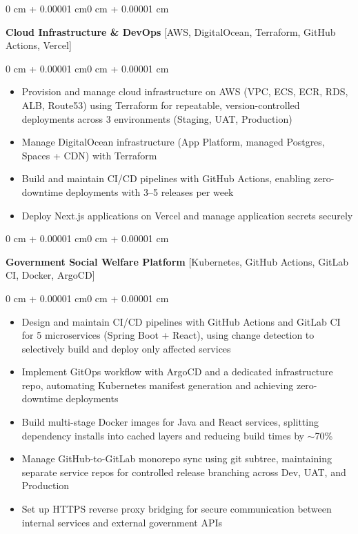 \documentclass[10pt, letterpaper]{article}
\newenvironment{highlights}{
    \begin{itemize}[
        topsep=0.06 cm,
        parsep=0.06 cm,
        partopsep=0pt,
        itemsep=0pt,
        leftmargin=0.4 cm + 10pt
    ]
}{
    \end{itemize}
}
\newenvironment{onecolentry}{
    \begin{adjustwidth}{0 cm + 0.00001 cm}{0 cm + 0.00001 cm}
}{
    \end{adjustwidth}
}
\begin{document}
        \vspace{0.22 cm}
        \begin{onecolentry}
            \textbf{Cloud Infrastructure \& DevOps} [AWS, DigitalOcean, Terraform, GitHub Actions, Vercel]
        \end{onecolentry}

        \vspace{0.10 cm}
        \begin{onecolentry}
            \begin{highlights}
                \item Provision and manage cloud infrastructure on AWS (VPC, ECS, ECR, RDS, ALB, Route53) using Terraform for repeatable, version-controlled deployments across 3 environments (Staging, UAT, Production)
                \item Manage DigitalOcean infrastructure (App Platform, managed Postgres, Spaces + CDN) with Terraform
                \item Build and maintain CI/CD pipelines with GitHub Actions, enabling zero-downtime deployments with 3--5 releases per week
                \item Deploy Next.js applications on Vercel and manage application secrets securely
            \end{highlights}
        \end{onecolentry}

        \vspace{0.22 cm}
        \begin{onecolentry}
            \textbf{Government Social Welfare Platform} [Kubernetes, GitHub Actions, GitLab CI, Docker, ArgoCD]
        \end{onecolentry}

        \vspace{0.10 cm}
        \begin{onecolentry}
            \begin{highlights}
                \item Design and maintain CI/CD pipelines with GitHub Actions and GitLab CI for 5 microservices (Spring Boot + React), using change detection to selectively build and deploy only affected services
                \item Implement GitOps workflow with ArgoCD and a dedicated infrastructure repo, automating Kubernetes manifest generation and achieving zero-downtime deployments
                \item Build multi-stage Docker images for Java and React services, splitting dependency installs into cached layers and reducing build times by $\sim$70\%
                \item Manage GitHub-to-GitLab monorepo sync using git subtree, maintaining separate service repos for controlled release branching across Dev, UAT, and Production
                \item Set up HTTPS reverse proxy bridging for secure communication between internal services and external government APIs
            \end{highlights}
        \end{onecolentry}
\end{document}
